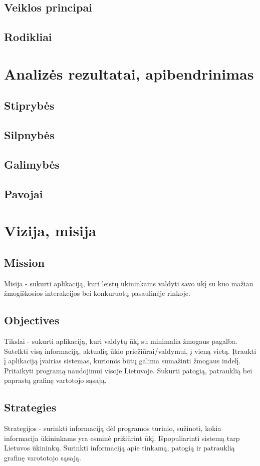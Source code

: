 \documentclass[oneside]{VUMIFPSkursinis}
\begin{document}
	\subsection{Veiklos principai}
	\subsection{Rodikliai}
\section{Analizės rezultatai, apibendrinimas}
	\subsection{Stiprybės}
	\subsection{Silpnybės}
	\subsection{Galimybės}
	\subsection{Pavojai}
\section{Vizija, misija}
\subsection{Mission}
Misija - sukurti aplikaciją, kuri leistų ūkininkams valdyti savo ūkį su kuo mažiau žmogiškosios interakcijos bei konkuruotų pasaulinėje rinkoje.
\subsection{Objectives}
Tikslai - sukurti aplikaciją, kuri valdytų ūkį su minimalia žmogaus pagalba.
Sutelkti visą informaciją, aktualią ūkio priežiūrai/valdymui, į vieną vietą.
Įtraukti į aplikaciją įvairias sistemas, kuriomis būtų galima sumažinti žmogaus indelį.
Pritaikyti programą naudojimui visoje Lietuvoje.
Sukurti patogią, patrauklią bei paprastą grafinę vartotojo sąsają.
\subsection{Strategies}
Strategijos - surinkti informaciją dėl programos turinio, sužinoti, kokia informacija ūkininkams yra esminė prižiūrint ūkį.
Išpopuliarinti sistemą tarp Lietuvos ūkininkų.
Surinkti informaciją apie tinkamą, patogią ir patrauklią grafinę varototojo sąsają.
\end{document}
